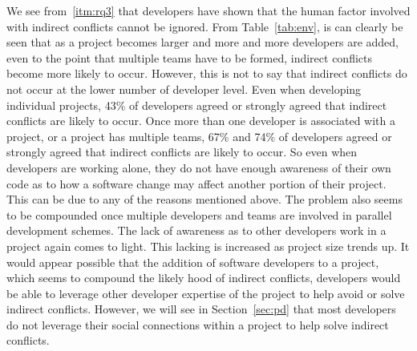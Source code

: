\documentclass[conference]{IEEEtran}
\begin{document}
We see from~\ref{itm:rq3} that developers have shown that the human factor involved with indirect conflicts cannot be ignored.
From Table~\ref{tab:env}, is can clearly be seen that as a project becomes larger and more and more developers are added, even to the point
that multiple teams have to be formed, indirect conflicts become more likely to occur. However, this is not to say that indirect conflicts
do not occur at the lower number of developer level. Even when developing individual projects, 43\% of developers agreed or strongly agreed
that indirect conflicts are likely to occur. Once more than one developer is associated with a project, or a project has multiple teams, 
67\% and 74\% of developers agreed or strongly agreed that indirect conflicts are likely to occur. So even when developers are working alone,
they do not have enough awareness of their own code as to how a software change may affect another portion of their project. This can be due to
any of the reasons mentioned above. The problem also seems to be compounded once multiple developers and teams are involved in parallel development
schemes. The lack of awareness as to other developers work in a project again comes to light. This lacking is increased as project size trends up.
It would appear possible that the addition of software developers to a project, which seems to compound the likely hood of indirect
conflicts, developers would be able to leverage other developer expertise of the project to help avoid or solve indirect conflicts.
However, we will see in Section~\ref{sec:pd} that most developers do not leverage their social connections within a project to help
solve indirect conflicts.
\end{document}
